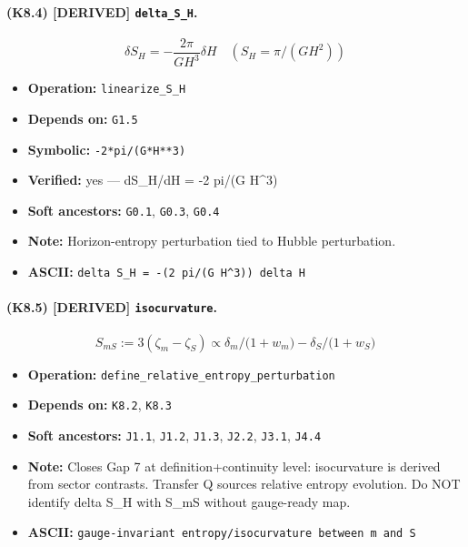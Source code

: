 \documentclass[11pt,a4paper]{article}
\theoremstyle{remark}\newtheorem*{caution}{Caution}
\newcommand{\tagbox}[1]{\textsc{[#1]}}
\begin{document}
\paragraph{(K8.4) \tagbox{DERIVED} \texttt{delta\_S\_H}.}
\begin{equation}
\delta S_H=-\frac{2\pi}{G H^3}\delta H\quad(S_H=\pi/(GH^2))
\tag{K8.4}
\end{equation}
\begin{itemize}\setlength{\itemsep}{0.12em}
\item \textbf{Operation:} \texttt{linearize\_S\_H}
\item \textbf{Depends on:} \texttt{G1.5}
\item \textbf{Symbolic:} \texttt{-2*pi/(G*H**3)}
\item \textbf{Verified:} yes --- dS\_H/dH = -2 pi/(G H^3)
\item \textbf{Soft ancestors:} \texttt{G0.1}, \texttt{G0.3}, \texttt{G0.4}
\item \textbf{Note:} Horizon-entropy perturbation tied to Hubble perturbation.
\item \textbf{ASCII:} \texttt{delta S\_H = -(2 pi/(G H^3)) delta H}
\end{itemize}
\paragraph{(K8.5) \tagbox{DERIVED} \texttt{isocurvature}.}
\begin{equation}
S_{mS}:=3(\zeta_m-\zeta_S)\propto \delta_m/\bigl(1+w_m\bigr)-\delta_S/\bigl(1+w_S\bigr)
\tag{K8.5}
\end{equation}
\begin{itemize}\setlength{\itemsep}{0.12em}
\item \textbf{Operation:} \texttt{define\_relative\_entropy\_perturbation}
\item \textbf{Depends on:} \texttt{K8.2}, \texttt{K8.3}
\item \textbf{Soft ancestors:} \texttt{J1.1}, \texttt{J1.2}, \texttt{J1.3}, \texttt{J2.2}, \texttt{J3.1}, \texttt{J4.4}
\item \textbf{Note:} Closes Gap 7 at definition+continuity level: isocurvature is derived from sector contrasts. Transfer Q sources relative entropy evolution. Do NOT identify delta S\_H with S\_mS without gauge-ready map.
\item \textbf{ASCII:} \texttt{gauge-invariant entropy/isocurvature between m and S}
\end{itemize}
\end{document}
